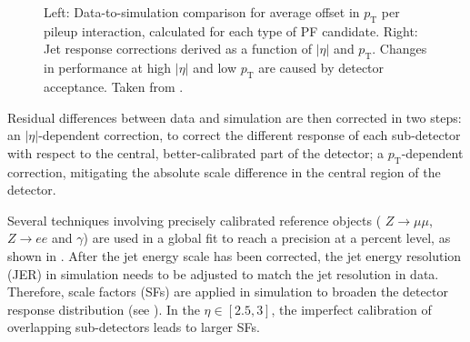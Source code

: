 \documentclass[a4paper,11pt]{article}
\newcommand{\pt}{\ensuremath{p_{\text{T}}}\xspace}
\begin{document}
\begin{figure}[htb]
\centering
{}
\caption{Left: Data-to-simulation comparison for average offset in \pt per pileup interaction, calculated for each type of PF candidate. Right: Jet response corrections derived as a function of $|\eta|$ and $\pt$. Changes in performance at high $|\eta|$ and low \pt are caused by detector acceptance. Taken from \citep{JERCNotes}.}
\label{fig:JEC}
\end{figure}

Residual differences between data and simulation are then corrected in two steps: an $|\eta|$-dependent correction, to correct the different response of each sub-detector with respect to the central, better-calibrated part of the detector; a \pt-dependent correction, mitigating the absolute scale difference in the central region of the detector. 

Several techniques involving precisely calibrated reference objects ( $Z\to\mu\mu$, $Z\to ee$ and $\gamma$) are used in a global fit to reach a precision at a percent level, as shown in  .
After the jet energy scale has been corrected, the jet energy resolution (JER) in simulation needs to be adjusted to match the jet resolution in data. Therefore, scale factors (SFs) are applied in simulation to broaden the detector response distribution (see ). 
In the $\eta\in[2.5,3]$, the imperfect calibration of overlapping sub-detectors leads to larger SFs.
\end{document}
